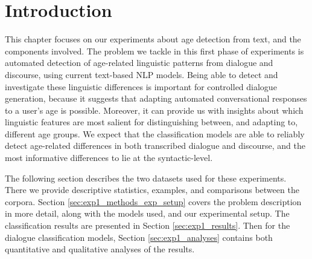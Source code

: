 \section{Introduction}


This chapter focuses on our experiments about age detection from text, and the components involved. The problem we tackle in this first phase of experiments is automated detection of age-related linguistic patterns from dialogue and discourse, using current text-based NLP models. Being able to detect and investigate these linguistic differences is important for controlled dialogue generation, because it suggests that adapting automated conversational responses to a user's age is possible. Moreover, it can provide us with insights about which linguistic features are most salient for distinguishing between, and adapting to, different age groups. We expect that the classification models are able to reliably detect age-related differences in both transcribed dialogue and discourse, and the most informative differences to lie at the syntactic-level.

The following section describes the two datasets used for these experiments. There we provide descriptive statistics, examples, and comparisons between the corpora. Section \ref{sec:exp1_methods_exp_setup} covers the problem description in more detail, along with the models used, and our experimental setup. The classification results are presented in Section \ref{sec:exp1_results}. Then for the dialogue classification models, Section \ref{sec:exp1_analyses} contains both quantitative and qualitative analyses of the results.